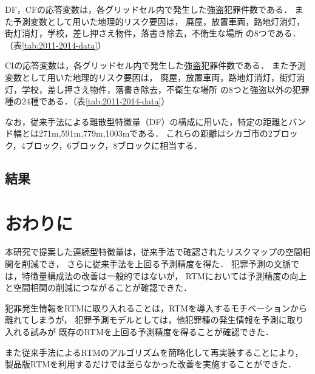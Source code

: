 DF，CFの応答変数は，各グリッドセル内で発生した強盗犯罪件数である．
また予測変数として用いた地理的リスク要因は，
廃屋，放置車両，路地灯消灯，街灯消灯，学校，差し押さえ物件，落書き除去，不衛生な場所
の8つである．（表\ref{tab:2011-2014-data}）

CIの応答変数は，各グリッドセル内で発生した強盗犯罪件数である．
また予測変数として用いた地理的リスク要因は，
廃屋，放置車両，路地灯消灯，街灯消灯，学校，差し押さえ物件，落書き除去，不衛生な場所
の8つと強盗以外の犯罪種の24種である．（表\ref{tab:2011-2014-data}）

なお，従来手法による離散型特徴量（DF）の構成に用いた，特定の距離とバンド幅とは271m,591m,779m,1003mである．
これらの距離はシカゴ市の2ブロック，4ブロック，6ブロック，8ブロックに相当する．
\subsection{結果}


\section{おわりに}
本研究で提案した連続型特徴量は，従来手法で確認されたリスクマップの空間相関を削減でき，
さらに従来手法を上回る予測精度を得た．
犯罪予測の文脈では，特徴量構成法の改善は一般的ではないが，
RTMにおいては予測精度の向上と空間相関の削減につながることが確認できた．

犯罪発生情報をRTMに取り入れることは，RTMを導入するモチベーションから離れてしまうが，
犯罪予測モデルとしては，他犯罪種の発生情報を予測に取り入れる試みが
既存のRTMを上回る予測精度を得ることが確認できた．

また従来手法によるRTMのアルゴリズムを簡略化して再実装することにより，
製品版RTMを利用するだけでは至らなかった改善を実施することができた．


